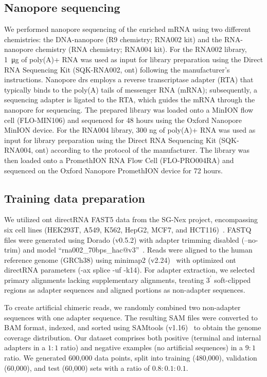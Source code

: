 \documentclass[pdflatex, sn-mathphys-num, lineno]{sn-jnl}%
\theoremstyle{thmstyleone}%
\theoremstyle{thmstyletwo}%
\theoremstyle{thmstylethree}%
\begin{document}
\subsection{Nanopore sequencing}

We performed nanopore sequencing of the enriched mRNA using two different chemistries: the DNA-nanopore (R9 chemistry; RNA002 kit) and the RNA-nanopore chemistry (RNA chemistry; RNA004 kit).
For the RNA002 library, \SI{1}{\micro\gram} of poly(A)+ RNA was used as input for library preparation using the Direct RNA Sequencing Kit (SQK-RNA002, \gls{ont}) following the manufacturer's instructions.
Nanopore \gls{drs} employs a reverse transcriptase adapter (RTA) that typically binds to the poly(A) tails of messenger RNA (mRNA); subsequently, a sequencing adapter is ligated to the RTA, which guides the mRNA through the nanopore for sequencing.
The prepared library was loaded onto a MinION flow cell (FLO-MIN106) and sequenced for 48 hours using the Oxford Nanopore MinION device.
For the RNA004 library, 300 ng of poly(A)+ RNA was used as input for library preparation using the Direct RNA Sequencing Kit (SQK-RNA004, \gls{ont}) according to the protocol of the manufacturer.
The library was then loaded onto a PromethION RNA Flow Cell (FLO-PRO004RA) and sequenced on the Oxford Nanopore PromethION device for 72 hours.

\subsection{Training data preparation}\label{ssec:data}

We utilized \gls{ont} directRNA FAST5 data from the SG-Nex project, encompassing six cell lines (HEK293T, A549, K562, HepG2, MCF7, and HCT116)~\cite{chen2021systematic}.
FASTQ files were generated using Dorado (v0.5.2) with adapter trimming disabled (--no-trim) and  model ``rna002\_70bps\_hac@v3''~\cite{dorado2023}.
Reads were aligned to the human reference genome (GRCh38) using minimap2 (v2.24)~\cite{li2018minimap2} with optimized \gls{ont} directRNA parameters (-ax splice -uf -k14).
For adapter extraction, we selected primary alignments lacking supplementary alignments, treating \(3^{\prime}\)  soft-clipped regions as adapter sequences and aligned portions as non-adapter sequences.

To create artificial chimeric reads, we randomly combined two non-adapter sequences with one adapter sequence.
The resulting SAM files were converted to BAM format, indexed, and sorted using SAMtools (v1.16)~\cite{li2009sequence} to obtain the genome coverage distribution.
Our dataset comprises both positive (terminal and internal adapters in a $1:1$ ratio) and negative examples (no artificial sequences) in a $9:1$ ratio.
We generated 600,000 data points, split into training (480,000), validation (60,000), and test (60,000) sets with a ratio of \(0.8:0.1:0.1\).
\end{document}
